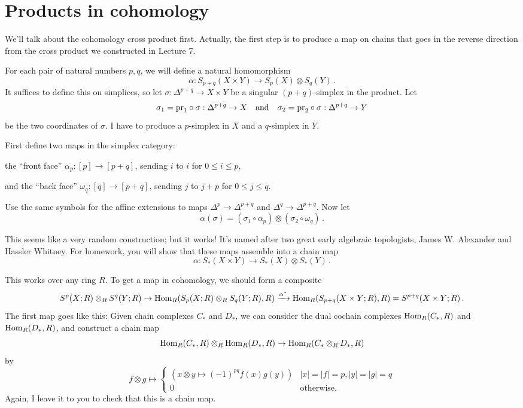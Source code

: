 \section{Products in cohomology}

We'll talk about the cohomology cross product first. Actually, the first
step is to produce a map on chains that goes in the reverse direction from
the cross product we constructed in Lecture 7. 

\begin{construction}
For each pair of natural numbers $p,q$, we will define a natural homomorphism 
\[
\alpha: S_{p+q}(X\times Y)\to S_p(X)\otimes S_q(Y)\,.
\]
It suffices to define this on simplices, so let 
$\sigma:\Delta^{p+q}\to X\times Y$ be a singular $(p+q)$-simplex in the product. Let 
\[
\sigma_1=\mathrm{pr}_1\circ\sigma:\Delta^{p+q}\to X\quad\hbox{and}\quad 
\sigma_2=\mathrm{pr}_2\circ\sigma:\Delta^{p+q}\to Y
\] 
be the two coordinates of $\sigma$. I have to produce
a $p$-simplex in $X$ and a $q$-simplex in $Y$.
 
First define two maps in the simplex category: 

\smallskip
the ``front face''  $\alpha_p:[p]\to[p+q]$, sending $i$ to $i$ for $0\leq i\leq p$, 

\smallskip
and the ``back face'' $\omega_q:[q]\to[p+q]$, sending $j$ to $j+p$ for $0\leq j\leq q$. 

\smallskip\noindent
Use the same symbols for the affine 
extensions to maps $\Delta^p\to \Delta^{p+q}$ and $\Delta^q\to\Delta^{p+q}$. 
Now let 
\[
\alpha(\sigma)=(\sigma_1\circ\alpha_p)\otimes(\sigma_2\circ\omega_q)\,.
\]
\end{construction}
This seems like a very random construction; but it works! It's named after two
great early algebraic topologists, James W. Alexander and Hassler Whitney.
For homework, you will show that these maps assemble into a chain map
\[
\alpha:S_\ast(X\times Y)\to S_\ast(X)\otimes S_\ast(Y)\,.
\]

This works over any ring $R$. To get a map in cohomology, we should form
a composite 
\[
S^p(X;R)\otimes_RS^q(Y;R)\to
\operatorname{Hom}_R(S_p(X;R)\otimes_RS_q(Y;R),R)\xrightarrow{\alpha^*}
\operatorname{Hom}_R(S_{p+q}(X\times Y;R),R)=S^{p+q}(X\times Y;R)\,.
\]
The first map goes like this: Given chain complexes $C_\ast$ and $D_\ast$, 
we can consider the dual cochain complexes $\operatorname{Hom}_R(C_\ast,R)$ and
$\operatorname{Hom}_R(D_\ast,R)$, and construct a chain map 
\[
\operatorname{Hom}_R(C_\ast,R)\otimes_R\operatorname{Hom}_R(D_\ast,R)\to\operatorname{Hom}_R(C_\ast\otimes_R D_\ast,R)
\]
by 
\begin{equation*}
f\otimes g\mapsto\begin{cases}
(x\otimes y\mapsto (-1)^{pq}f(x)g(y)) & |x|=|f|=p, |y|=|g|=q\\
0 & \text{otherwise}.
\end{cases}
\end{equation*}
Again, I leave it to you to check that this is a chain map. 

